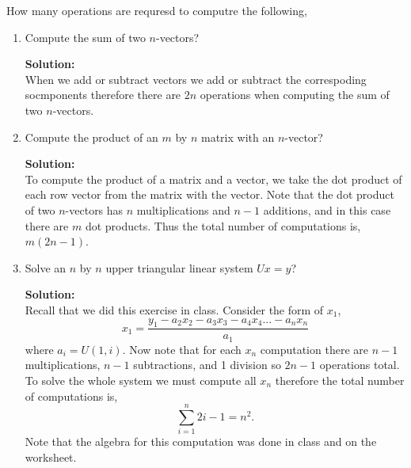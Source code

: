 \documentclass[12pt]{article}
\makeatletter
\theoremstyle{homework}
\newenvironment{exercise}[1]
{\def\@currentlabel{#1}\exercisecore}
{\endexercisecore}
\newcommand{\localhead}[1]{\par\smallskip\noindent\textbf{#1}\nobreak\\}%
\newcommand\solution{\localhead{Solution:}}
\makeatother
\begin{document}
\begin{exercise}{Problem 7.6} How many operations are requresd to computre the following,
	\begin{enumerate}
		\item Compute the sum of two $n$-vectors?\\
		
		\solution When we add or subtract vectors we add or subtract the correspoding socmponents therefore there are
		$2n$ operations when computing the sum of two $n$-vectors. 
		\vspace{.25in}



		\item Compute the product of an $m$ by $n$ matrix with an $n$-vector?\\
		
		\solution To compute the product of a matrix and a vector, we take the dot product of each row vector from the matrix with the vector. 
		Note that the dot product of two $n$-vectors has $n$ multiplications and $n-1$ additions, and in this case there are $m$ dot products. Thus
		the total number of computations is, $m(2n-1)$. 




		\vspace{.25in}



		\item Solve an $n$ by $n$ upper triangular linear system $Ux = y$?\\
		
		\solution Recall that we did this exercise in class. Consider the form of $x_1$,
		\begin{equation*}
			x_1 = \dfrac{y_1 - a_2x_2 - a_3x_3 - a_4x_4 ... - a_nx_n}{a_1}
		\end{equation*}
		where $a_i = U(1,i)$. Now note that for each $x_n$ computation there are $n-1$ multiplications, $n-1$ subtractions, and 1 division so $2n-1$ operations total. 
		To solve the whole system we must compute all $x_n$ therefore the total number of computations is,
		\begin{equation*}
			\sum_{i = 1}^n 2i - 1 = n^2.
		\end{equation*}  
		Note that the algebra for this computation was done in class and on the worksheet. 
	\end{enumerate}
\end{exercise}
\end{document}
